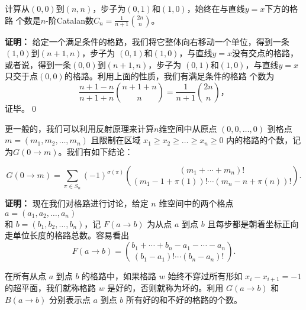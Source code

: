 \begin{coro}
计算从$(0,0)$到$(n,n)$，步子为$(0,1)$和$(1,0)$，始终在与直线$y=x$下方的格路
个数是$n$-阶Catalan数$C_n=\frac{1}{n+1}{2n \choose n}$。
\end{coro}
{\bf{证明：}}
给定一个满足条件的格路，我们将它整体向右移动一个单位，得到一条$(1,0)$到$(n+1,n)$，步子为
$(0,1)$和$(1,0)$，与直线$y=x$没有交点的格路，或者说，得到一条$(0,0)$到$(n+1,n)$，步子为
$(0,1)$和$(1,0)$，与直线$y=x$只交于点$(0,0)$的格路。利用上面的性质，我们有满足条件的格路
个数为
\begin{equation*}
\frac{n+1-n}{n+1+n}{n+1+n \choose n}=\frac{1}{n+1}{2n \choose n}，
\end{equation*}
证毕。\qed


更一般的，我们可以利用反射原理来计算$n$维空间中从原点
$(0,0,\ldots,0)$ 到格点 $m=(m_1,m_2,\ldots,m_n)$ 且限制在区域
$x_1\geq x_2\geq \ldots\geq x_n\geq 0$
内的格路的个数，记为$G(0\rightarrow m)$。我们有如下结论：
\begin{thm}{\rm \cite{Zeiber1983}}
\[
G(0\rightarrow m)=\sum_{\pi\in
S_n}(-1)^{\sigma(\pi)}{{(m_1+\cdots+m_n)!}\choose
{(m_1-1+\pi(1))!\cdots(m_n-n+\pi(n))!}}.
\]
\end{thm}
{\bf{证明：}}
现在我们对格路进行讨论，给定 $n$ 维空间中的两个格点 $a=(a_1,a_2,\ldots,a_n)$\\
和 $b=(b_1,b_2,\ldots,b_n)$，记 $F(a\rightarrow b)$ 为从点 $a$ 到点
$b$ 且每步都是朝着坐标正向走单位长度的格路总数。容易看出
$$F(a\rightarrow
b)={{b_1+\cdots+b_n-a_1-\cdots-a_n}\choose{(b_1-a_1)!\cdots(b_n-a_n)!}}.$$

在所有从点 $a$ 到点 $b$ 的格路中，如果格路 $w$ 始终不穿过所有形如
$x_i-x_{i+1}=-1$ 的超平面，我们就称格路 $w$
是好的，否则就称为坏的。利用 $G(a\rightarrow b)$ 和 $B(a\rightarrow
b)$ 分别表示点 $a$ 到点 $b$ 所有好的和不好的格路的个数。

